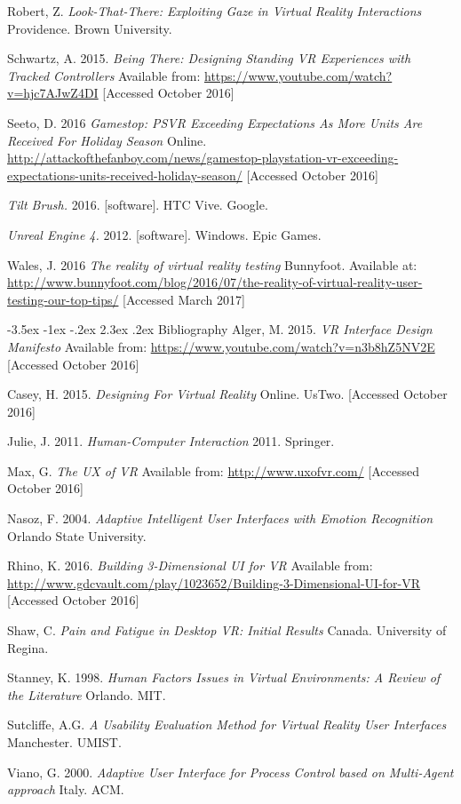 \documentclass[12pt]{article}
\makeatletter
\renewcommand{\section}{\@startsection {section}{1}{\z@}%
             {-3.5ex \@plus -1ex \@minus -.2ex}%
             {2.3ex \@plus .2ex}%
             {\normalfont\Large\scshape\bfseries}}
\makeatother
\begin{document}
Robert, Z. \emph{Look-That-There: Exploiting Gaze in Virtual Reality Interactions} Providence. Brown University. 

Schwartz, A. 2015. \emph{Being There: Designing Standing VR Experiences with Tracked Controllers} Available from: \url{https://www.youtube.com/watch?v=hjc7AJwZ4DI} [Accessed October 2016]

Seeto, D. 2016 \emph{Gamestop: PSVR Exceeding Expectations As More Units Are Received For Holiday Season} Online. \url{http://attackofthefanboy.com/news/gamestop-playstation-vr-exceeding-expectations-units-received-holiday-season/} [Accessed October 2016]

\emph{Tilt Brush.} 2016. [software]. HTC Vive. Google. 

\emph{Unreal Engine 4.} 2012. [software]. Windows. Epic Games. 

Wales, J. 2016 \emph{The reality of virtual reality testing} Bunnyfoot. Available at: \url{http://www.bunnyfoot.com/blog/2016/07/the-reality-of-virtual-reality-user-testing-our-top-tips/} [Accessed March 2017]


\section{Bibliography}
Alger, M. 2015. \emph{VR Interface Design Manifesto} Available from: \url{https://www.youtube.com/watch?v=n3b8hZ5NV2E} [Accessed October 2016]

Casey, H. 2015. \emph{Designing For Virtual Reality} Online. UsTwo. [Accessed October 2016]

Julie, J. 2011. \emph{Human-Computer Interaction} 2011. Springer. 

Max, G. \emph{The UX of VR} Available from: \url{http://www.uxofvr.com/} [Accessed October 2016]

Nasoz, F. 2004. \emph{Adaptive Intelligent User Interfaces with Emotion Recognition} Orlando State University. 

Rhino, K. 2016. \emph{Building 3-Dimensional UI for VR} Available from: \url{http://www.gdcvault.com/play/1023652/Building-3-Dimensional-UI-for-VR} [Accessed October 2016]

Shaw, C. \emph{Pain and Fatigue in Desktop VR: Initial Results} Canada. University of Regina. 

Stanney, K. 1998. \emph{Human Factors Issues in Virtual Environments: A Review of the Literature} Orlando. MIT. 

Sutcliffe, A.G. \emph{A Usability Evaluation Method for Virtual Reality User Interfaces} Manchester. UMIST. 

Viano, G. 2000. \emph{Adaptive User Interface for Process Control based on Multi-Agent approach} Italy. ACM. 
\end{document}

